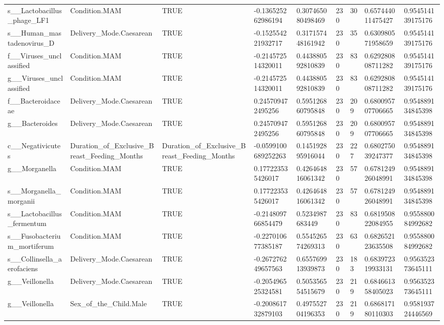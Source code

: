 \begin{longtable}{lllllllll}
s\_\_Lactobacillus\_phage\_LF1 & Condition.MAM & TRUE & -0.136525262986194 & 0.307465080498469 & 230 & 30 & 0.657444011475427 & 0.954514139175176 \\
s\_\_Human\_mastadenovirus\_D & Delivery\_Mode.Caesarean & TRUE & -0.152554221932717 & 0.317157448161942 & 230 & 35 & 0.630980571958659 & 0.954514139175176 \\
f\_\_Viruses\_unclassified & Condition.MAM & TRUE & -0.214572514320011 & 0.443880592810839 & 230 & 83 & 0.629280808711282 & 0.954514139175176 \\
g\_\_Viruses\_unclassified & Condition.MAM & TRUE & -0.214572514320011 & 0.443880592810839 & 230 & 83 & 0.629280808711282 & 0.954514139175176 \\
f\_\_Bacteroidaceae & Delivery\_Mode.Caesarean & TRUE & 0.245709472495256 & 0.595126860795848 & 230 & 209 & 0.680095707706665 & 0.954889134845398 \\
g\_\_Bacteroides & Delivery\_Mode.Caesarean & TRUE & 0.245709472495256 & 0.595126860795848 & 230 & 209 & 0.680095707706665 & 0.954889134845398 \\
c\_\_Negativicutes & Duration\_of\_Exclusive\_Breast\_Feeding\_Months & Duration\_of\_Exclusive\_Breast\_Feeding\_Months & -0.0599100689252263 & 0.145192895916044 & 230 & 227 & 0.680275039247377 & 0.954889134845398 \\
g\_\_Morganella & Condition.MAM & TRUE & 0.177223535426017 & 0.426464816061342 & 230 & 57 & 0.678124926048991 & 0.954889134845398 \\
s\_\_Morganella\_morganii & Condition.MAM & TRUE & 0.177223535426017 & 0.426464816061342 & 230 & 57 & 0.678124926048991 & 0.954889134845398 \\
s\_\_Lactobacillus\_fermentum & Condition.MAM & TRUE & -0.214809766854479 & 0.5234987683449 & 230 & 83 & 0.681950822084955 & 0.955880084992682 \\
s\_\_Fusobacterium\_mortiferum & Condition.MAM & TRUE & -0.227010677385187 & 0.554526574269313 & 230 & 63 & 0.682652123635508 & 0.955880084992682 \\
s\_\_Collinsella\_aerofaciens & Delivery\_Mode.Caesarean & TRUE & -0.267276249657563 & 0.655769913939873 & 230 & 183 & 0.683972319933131 & 0.956352373645111 \\
g\_\_Veillonella & Delivery\_Mode.Caesarean & TRUE & -0.205496525324581 & 0.505356554515679 & 230 & 219 & 0.684661358405023 & 0.956352373645111 \\
g\_\_Veillonella & Sex\_of\_the\_Child.Male & TRUE & -0.200861732879103 & 0.497552704196353 & 230 & 219 & 0.686817180110303 & 0.958193724446569 \\

\end{longtable}
